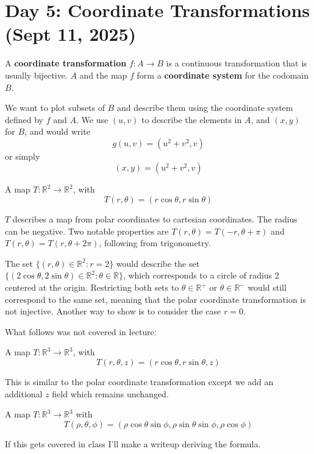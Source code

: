 \section{Day 5: Coordinate Transformations (Sept 11, 2025)}

\begin{definition}
A \textbf{coordinate transformation} $f: A \to B$ is a continuous transformation that is usually bijective. $A$ and the map $f$ form a \textbf{coordinate system} for the codomain $B$.
\end{definition}

We want to plot subsets of $B$ and  describe them using the coordinate system defined by $f$ and $A$. We use $(u, v)$ to describe the elements in $A$, and $(x, y)$ for $B$, and would write
\[
g(u, v) = (u^2 + v^2, v)
\]
or simply
\[
(x, y) = (u^2 + v^2, v)
\]

\begin{definition}
A map $T: \mathbb{R}^2 \to \mathbb{R}^2$, with
\[
    T(r, \theta) = (r \cos \theta, r \sin \theta)
\]
\end{definition}
\noindent $T$ describes a map from polar coordinates to cartesian coordinates. The radius can be negative. Two notable properties are $T(r, \theta) = T(-r, \theta + \pi)$ and $T(r, \theta) = T(r, \theta + 2\pi)$, following from trigonometry.

The set $\{ (r, \theta) \in \mathbb{R}^2 : r = 2\}$ would describe the set $\{ (2 \cos \theta, 2 \sin \theta) \in \mathbb{R}^2 : \theta \in \mathbb{R} \}$, which corresponds to a circle of radius 2 centered at the origin. Restricting both sets to $\theta \in \mathbb{R}^+$ or $\theta \in \mathbb{R}^-$ would still correspond to the same set, meaning that the polar coordinate transformation is not injective. Another way to show is to consider the case $r = 0$.

\noindent What follows was not covered in lecture:
\begin{definition}
A map $T: \mathbb{R}^3 \to \mathbb{R}^3$, with
\[
    T(r, \theta, z) = (r \cos \theta, r \sin \theta, z)
\]
\end{definition}
This is similar to the polar coordinate transformation except we add an additional $z$ field which remains unchanged. 
\begin{definition}
A map $T: \mathbb{R}^3 \to \mathbb{R}^3$ with
\[
    T(\rho, \theta, \phi) = (\rho \cos \theta \sin \phi, \rho \sin \theta \sin \phi, \rho \cos \phi)
\]
\end{definition}
\noindent If this gets covered in class I'll make a writeup deriving the formula.
